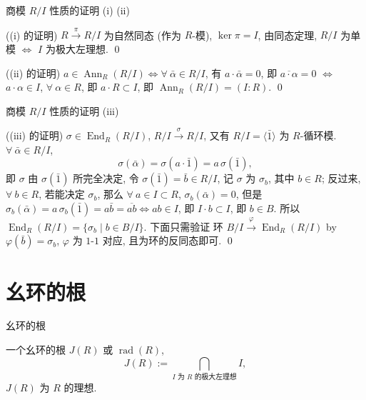 
\begin{frame}{商模 $R/I$ 性质的证明 (i) (ii)}

\startproof[bg=yellow, fg=red]((i) 的证明)
$R \xrightarrow{\ \pi\ } R/I$ 为自然同态 (作为 $R$-模), $\ker \pi = I$,
由同态定理, $R/I$ 为单模 $\iff$ $I$ 为极大左理想.
\qed

\pause

\startproof[bg=yellow, fg=red]((ii) 的证明)
$a \in \operatorname{Ann}_R(R/I) \iff \forall\ \bar{\alpha} \in R/I$,
有 $a \cdot \bar{\alpha} = 0$, 即 $\overline{a \cdot \alpha} = 0$
$\iff$ $a \cdot \alpha \in I$, $\forall\ \alpha \in R$,
即 $a \cdot R \subset I$,
即 $\operatorname{Ann}_R(R/I) = (I:R)$.
\qed

\end{frame}


\begin{frame}{商模 $R/I$ 性质的证明 (iii)}

\startproof[bg=yellow, fg=red]((iii) 的证明)
$\sigma \in \operatorname{End}_R(R/I)$, $R/I \xrightarrow{\ \sigma\ } R/I$,
又有 $R/I = \langle \bar{1} \rangle$ 为 $R$-循环模.
$\forall\ \bar{\alpha} \in R/I$,
\[
\sigma(\bar{\alpha}) = \sigma(a \cdot \bar{1}) = a\,\sigma(\bar{1}),
\]
即 $\sigma$ 由 $\sigma(\bar{1})$ 所完全决定, 令 $\sigma(\bar{1}) = \bar{b}
\in R/I$, 记 $\sigma$ 为 $\sigma_b$, 其中 $b \in R$;
\pause
反过来, $\forall\ b \in R$, 若能决定 $\sigma_b$,
那么 $\forall\ a \in I \subset R$, $\sigma_b(\bar{\alpha}) = 0$,
但是 $\sigma_b(\bar{\alpha}) = a\,\sigma_b(\bar{1}) = a\bar{b}
= \overline{ab} \Longleftrightarrow ab \in I$,
即 $I \cdot b \subset I$, 即 $b \in B$.
所以 $\operatorname{End}_R(R/I) = \{ \sigma_b \mid b \in B/I \}$.
\pause
下面只需验证 环 $B/I \xrightarrow{\ \varphi\ } \operatorname{End}_R(R/I)$
by $\varphi(\bar{b}) = \sigma_b$, $\varphi$ 为 $1$-$1$ 对应,
且为环的反同态即可.
\qed

\end{frame}


\section[幺环的根]{幺环的根}


\begin{frame}{幺环的根}

\begin{Def}[幺环的根]
一个幺环的根 $J(R)$ 或 $\operatorname{rad}(R)$,
\[
J(R) := \bigcap_{I \text{ 为 } R \text{ 的极大左理想}} I ,
\]
$J(R)$ 为 $R$ 的理想.
\end{Def}

\end{frame}

